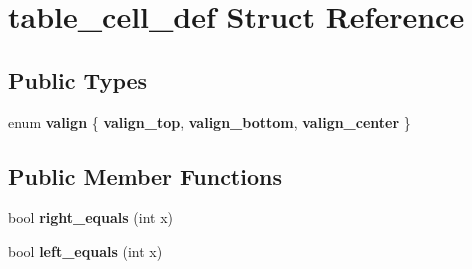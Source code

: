 \hypertarget{structtable__cell__def}{}\section{table\+\_\+cell\+\_\+def Struct Reference}
\label{structtable__cell__def}
\subsection*{Public Types}
\begin{DoxyCompactItemize}
\item 
\mbox{\label{structtable__cell__def_a88ec8037df3ae63320e8951071e842d0}} 
enum {\bfseries valign} \{ {\bfseries valign\+\_\+top}, 
{\bfseries valign\+\_\+bottom}, 
{\bfseries valign\+\_\+center}
 \}
\end{DoxyCompactItemize}
\subsection*{Public Member Functions}
\begin{DoxyCompactItemize}
\item 
\mbox{\label{structtable__cell__def_a2775377a87e10a0c5a9ce61728c418fa}} 
bool {\bfseries right\+\_\+equals} (int x)
\item 
\mbox{\label{structtable__cell__def_aaaa254fd39b4f381aca19fa33290bd12}} 
bool {\bfseries left\+\_\+equals} (int x)
\end{DoxyCompactItemize}

